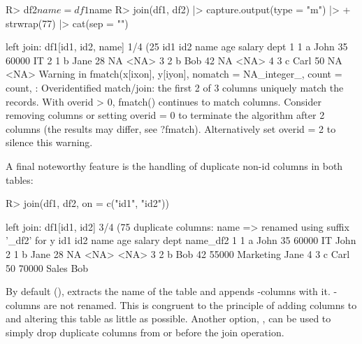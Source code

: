 \documentclass[nojss]{jss} %
\newcommand{\fct}[1]{\code{#1()}}
\begin{document}
\begin{Schunk}
\begin{Sinput}
R> df2$name = df1$name
R> join(df1, df2) |> capture.output(type = "m") |>
+    strwrap(77) |> cat(sep = "\n")
\end{Sinput}
\begin{Soutput}
left join: df1[id1, id2, name] 1/4 (25%) <m:m> df2[id1, id2, name] 1/4 (25%)
  id1 id2 name age salary dept
1   1   a John  35  60000   IT
2   1   b Jane  28     NA <NA>
3   2   b  Bob  42     NA <NA>
4   3   c Carl  50     NA <NA>
Warning in fmatch(x[ixon], y[iyon], nomatch = NA_integer_, count = count, :
Overidentified match/join: the first 2 of 3 columns uniquely match the
records. With overid > 0, fmatch() continues to match columns. Consider
removing columns or setting overid = 0 to terminate the algorithm after 2
columns (the results may differ, see ?fmatch). Alternatively set overid = 2
to silence this warning.
\end{Soutput}
\end{Schunk}
%
A final noteworthy feature is the handling of duplicate non-id columns in both tables:
%
\begin{Schunk}
\begin{Sinput}
R> join(df1, df2, on = c("id1", "id2"))
\end{Sinput}
\begin{Soutput}
left join: df1[id1, id2] 3/4 (75%) <m:m> df2[id1, id2] 3/4 (75%)
duplicate columns: name => renamed using suffix '_df2' for y
  id1 id2 name age salary      dept name_df2
1   1   a John  35  60000        IT     John
2   1   b Jane  28     NA      <NA>     <NA>
3   2   b  Bob  42  55000 Marketing     Jane
4   3   c Carl  50  70000     Sales      Bob
\end{Soutput}
\end{Schunk}
%
By default (), \fct{join} extracts the name of the  table and appends -columns with it. -columns are not renamed. This is congruent to the principle of adding columns to  and altering this table as little as possible. Another option, , can be used to simply drop duplicate columns from  or  before the join operation.
%
\end{document}
